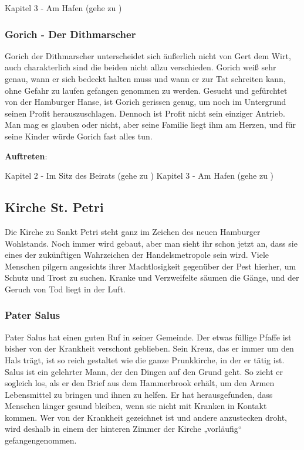 Kapitel 3 - Am Hafen (gehe zu \blue{\ref{imhund}})

\subsubsection*{Gorich - Der Dithmarscher}
\label{Gorich}

Gorich der Dithmarscher unterscheidet sich äußerlich nicht von Gert dem Wirt, auch charakterlich sind die beiden nicht allzu verschieden. Gorich weiß sehr genau, wann er sich bedeckt halten muss und wann er zur Tat schreiten kann, ohne Gefahr zu laufen gefangen genommen zu werden. Gesucht und gefürchtet von der Hamburger Hanse, ist Gorich gerissen genug, um noch im Untergrund seinen Profit herauszuschlagen. Dennoch ist Profit nicht sein einziger Antrieb. Man mag es glauben oder nicht, aber seine Familie liegt ihm am Herzen, und für seine Kinder würde Gorich fast alles tun.

\textbf{Auftreten}:

Kapitel 2 - Im Sitz des Beirats (gehe zu \blue{\ref{militär}})
Kapitel 3 - Am Hafen (gehe zu \blue{\ref{imhund}})

\subsection{Kirche St. Petri}

Die Kirche zu Sankt Petri steht ganz im Zeichen des neuen Hamburger Wohlstands. Noch immer wird gebaut, aber man sieht ihr schon jetzt an, dass sie eines der zukünftigen Wahrzeichen der Handelsmetropole sein wird. Viele Menschen pilgern angesichts ihrer Machtlosigkeit gegenüber der Pest hierher, um Schutz und Trost zu suchen. Kranke und Verzweifelte säumen die Gänge, und der Geruch von Tod liegt in der Luft.


\subsubsection*{Pater Salus}
\label{Salus}

Pater Salus hat einen guten Ruf in seiner Gemeinde. Der etwas füllige Pfaffe ist bisher von der Krankheit verschont geblieben. Sein Kreuz, das er immer um den Hals trägt, ist so reich gestaltet wie die ganze Prunkkirche, in der er tätig ist. Salus ist ein gelehrter Mann, der den Dingen auf den Grund geht. So zieht er sogleich los, als er den Brief aus dem Hammerbrook erhält, um den Armen Lebensmittel zu bringen und ihnen zu helfen. Er hat herausgefunden, dass Menschen länger gesund bleiben, wenn sie nicht mit Kranken in Kontakt kommen. Wer von der Krankheit gezeichnet ist und andere anzustecken droht, wird deshalb in einem der hinteren Zimmer der Kirche „vorläufig“ gefangengenommen.

